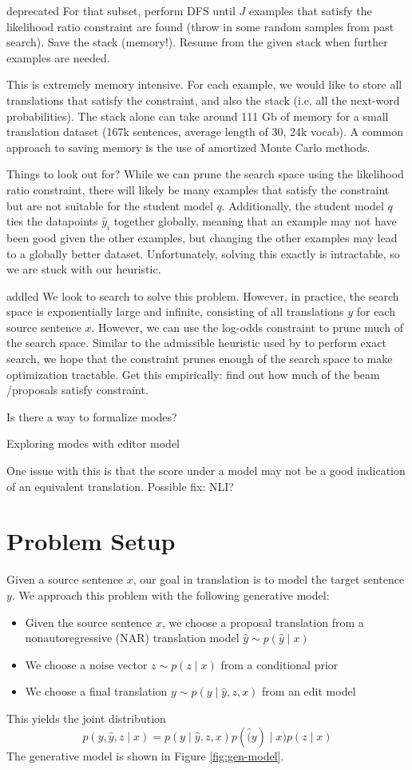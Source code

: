 \documentclass[11pt]{article}
\begin{document}
{\color{red}deprecated}
For that subset, perform DFS until $J$ examples that satisfy the likelihood ratio constraint
are found (throw in some random samples from past search). Save the stack (memory!).
Resume from the given stack when further examples are needed.

This is extremely memory intensive. For each example,
we would like to store all translations that satisfy the constraint,
and also the stack (i.e. all the next-word probabilities).
The stack alone can take around 111 Gb of memory for a small translation dataset
(167k sentences, average length of 30, 24k vocab).
A common approach to saving memory is the use of amortized Monte Carlo methods.

Things to look out for?
While we can prune the search space using the likelihood ratio constraint,
there will likely be many examples that satisfy the constraint but are not suitable for
the student model $q$.
Additionally, the student model $q$ ties the datapoints $\hat{y}_i$ together globally,
meaning that an example may not have been good given the other examples,
but changing the other examples may lead to a globally better dataset.
Unfortunately, solving this exactly is intractable, so we are stuck with our heuristic.

{\color{red}addled}
We look to search to solve this problem.
However, in practice, the search space is exponentially large and infinite, consisting
of all translations $y$ for each source sentence $x$.
However, we can use the log-odds constraint to prune much of the search space.
Similar to the admissible heuristic used by \citet{catgotyourtongue} to perform
exact search, we hope that the constraint prunes enough of the search space to make optimization
tractable.
{\color{red}Get this empirically: find out how much of the beam /proposals satisfy constraint}.

{\color{red}Is there a way to formalize modes?}

{\color{red}Exploring modes with editor model}

One issue with this is that the score under a model may not be a good indication of an
equivalent translation. Possible fix: NLI?


\section{Problem Setup}
Given a source sentence $x$, our goal in translation is to model the target sentence $y$.
We approach this problem with the following generative model:
\begin{itemize}
\item Given the source sentence $x$, we choose a proposal translation
    from a nonautoregressive (NAR) translation model  $\hat{y}\sim p(\hat{y} \mid x)$
\item We choose a noise vector $z \sim p(z \mid x)$ from a conditional prior
\item We choose a final translation $y \sim p(y \mid \hat{y}, z, x)$ from an edit model
\end{itemize}
This yields the joint distribution
$$p(y,\hat{y},z \mid x) = p(y \mid \hat{y}, z, x)p(\hat(y) \mid x)p(z \mid x)$$
The generative model is shown in Figure \ref{fig:gen-model}.
\end{document}
